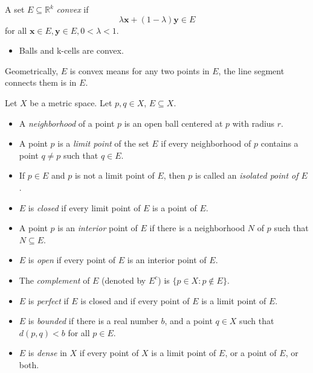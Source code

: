 \begin{definition}[Convex]
A set $E \subseteq \mathbb{R}^{k}$ \textit{convex} if 
$$
\lambda \mathbf{x} + (1-\lambda)\mathbf{y} \in E
$$
for all $\mathbf{x} \in E, \mathbf{y} \in E, 0 < \lambda < 1$.
\end{definition}

\begin{remark}
\begin{itemize}
    \item Balls and k-cells are convex.
\end{itemize}
\end{remark}

Geometrically, $E$ is convex means for any two points in $E$, the line segment connects them is in $E$.

\begin{definition} Let $X$ be a metric space. Let $p,q \in X$, $E \subseteq  X$.
\begin{itemize}
    \item A \textit{neighborhood} of a point $p$ is an open ball centered at $p$ with radius $r$.
    \item A point $p$ is a \textit{limit point} of the set $E$ if every neighborhood of $p$ contains a point $q \neq p$ such that $q \in E$.
    \item If $p \in E$ and $p$ is not a limit point of $E$, then $p$ is called an \textit{isolated point of $E$}.
    \item $E$ is \textit{closed}  if every limit point of $E$ is a point of $E$.
    \item A point $p$ is an \textit{interior} point of $E$ if there is a neighborhood $N$ of $p$ such that $N \subseteq  E$.
    \item $E$ is \textit{open} if every point of $E $ is an interior point of $E$.
    \item The \textit{complement} of $E$ (denoted by $E^{c}$) is $\{ p \in X: p \notin E \}$.
    \item $E$ is \textit{perfect} if $E$ is closed and if every point of $E$ is a limit point of $E$.
    \item $E$ is \textit{bounded} if there is a real number $b$, and a point $q \in X$ such that $d(p,q)<b$ for all $p \in E$.
    \item $E$ is \textit{dense}  in $X$ if every point of $X$ is a limit point of $E$, or a point of $E$, or both.
\end{itemize}
\end{definition}

